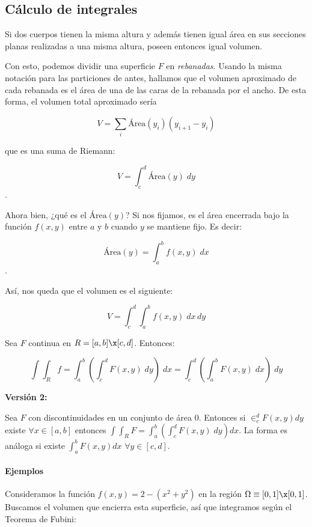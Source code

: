 \documentclass[nochap]{apuntes}
\begin{document}
\subsection{Cálculo de integrales}

\begin{lemma}
Si dos cuerpos tienen la misma altura y además tienen igual área en sus secciones planas realizadas a una misma altura, poseen entonces igual volumen.
\end{lemma}

Con esto, podemos dividir una superficie $F$ en \textit{rebanadas}. Usando la misma notación para las particiones de antes, hallamos que el volumen aproximado de cada rebanada es el área de una de las caras de la rebanada por el ancho. De esta forma, el volumen total aproximado sería

\[ V=\sum_i \text{Área}(y_i)(y_{i+1}-y_i) \]

que es una suma de Riemann:

\[ V = \int_c^d \text{Área}(y)\;dy \].

Ahora bien, ¿qué es el $\text{Área}(y)$? Si nos fijamos, es el área encerrada bajo la función $f(x,y)$ entre $a$ y $b$ cuando $y$ se mantiene fijo. Es decir:

\[ \text{Área}(y) = \int_a^bf(x,y)\;dx \].

Así, nos queda que el volumen es el siguiente:

\[ V = \int_c^d\int_a^b f(x,y) \;dx\,dy \]

\begin{theorem}
\label{lblFubini}
Sea $F$ continua en $R = [a,b] \x [c,d]$. Entonces:

\[ \int\int_R f = \int _a^b\left(\int_c^d F(x,y)\;dy\right)\;dx = \int_c^d \left(\int_a^b F(x,y)\;dx \right)\;dy \]

\textbf{Versión 2:}

Sea $F$ con discontinuidades en un conjunto de área 0. Entonces si $\in_c^d F(x,y) dy$ existe $\forall x \in [a,b]$ entonces $\int\int_R F = \int_a^b\left(\int_c^d F(x,y)\;dy\right)dx$. La forma es análoga si existe $\int_a^b F(x,y) dx$ $\forall y \in [c,d]$.
\end{theorem}

\paragraph{Ejemplos}

Consideramos la función $f(x,y) = 2 - (x^2+y^2)$ en la región $\Omega \equiv [0,1]\x[0,1]$. Buscamos el volumen que encierra esta superficie, así que integramos según el Teorema de Fubini:
\end{document}
